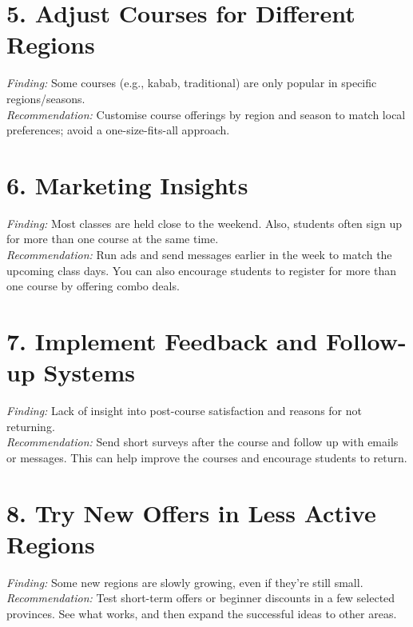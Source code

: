 \documentclass[12pt,a4paper]{article}
\begin{document}
\section*{5. Adjust Courses for Different Regions}
\textit{Finding:} Some courses (e.g., kabab, traditional) are only popular in specific regions/seasons. \\
\textit{Recommendation:} Customise course offerings by region and season to match local preferences; avoid a one-size-fits-all approach.

\section*{6. Marketing Insights}
\textit{Finding:} Most classes are held close to the weekend. Also, students often sign up for more than one course at the same time. \\
\textit{Recommendation:} Run ads and send messages earlier in the week to match the upcoming class days. You can also encourage students to register for more than one course by offering combo deals.

\section*{7. Implement Feedback and Follow-up Systems}
\textit{Finding:} Lack of insight into post-course satisfaction and reasons for not returning. \\
\textit{Recommendation:} Send short surveys after the course and follow up with emails or messages. This can help improve the courses and encourage students to return.

\section*{8. Try New Offers in Less Active Regions}
\textit{Finding:} Some new regions are slowly growing, even if they’re still small. \\
\textit{Recommendation:} Test short-term offers or beginner discounts in a few selected provinces. See what works, and then expand the successful ideas to other areas.
\end{document}
